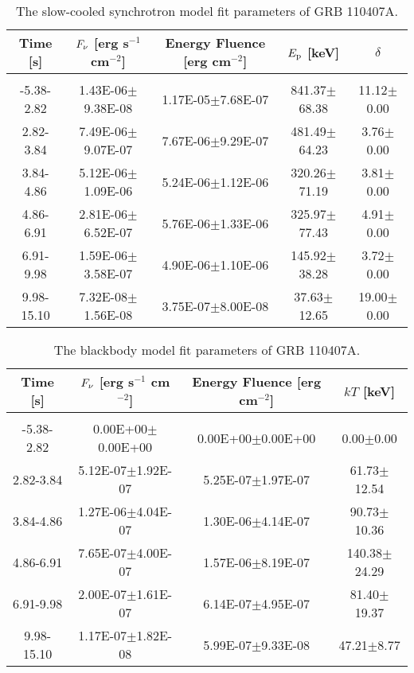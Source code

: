 \begin{table}[h]
\centering
\scriptsize
\label{tab:}
\begin{tabular}{c| c c c c}
Time [s] & $F_{\nu}$ [erg s$^{-1}$ cm$^{-2}$] & Energy Fluence [erg cm$^{-2}$] & $E_{\rm p}$ [keV] & $\delta$ \\
\hline \hline\\ 

-5.38-2.82 & 1.43E-06$\pm$9.38E-08 & 1.17E-05$\pm$7.68E-07 & 841.37$\pm$68.38 & 11.12$\pm$0.00 \\ 

2.82-3.84 & 7.49E-06$\pm$9.07E-07 & 7.67E-06$\pm$9.29E-07 & 481.49$\pm$64.23 & 3.76$\pm$0.00 \\ 

3.84-4.86 & 5.12E-06$\pm$1.09E-06 & 5.24E-06$\pm$1.12E-06 & 320.26$\pm$71.19 & 3.81$\pm$0.00 \\ 

4.86-6.91 & 2.81E-06$\pm$6.52E-07 & 5.76E-06$\pm$1.33E-06 & 325.97$\pm$77.43 & 4.91$\pm$0.00 \\ 

6.91-9.98 & 1.59E-06$\pm$3.58E-07 & 4.90E-06$\pm$1.10E-06 & 145.92$\pm$38.28 & 3.72$\pm$0.00 \\ 

9.98-15.10 & 7.32E-08$\pm$1.56E-08 & 3.75E-07$\pm$8.00E-08 & 37.63$\pm$12.65 & 19.00$\pm$0.00 \\ 

\end{tabular}
\caption{The slow-cooled synchrotron model fit parameters of GRB 110407A.}
\end{table}

\begin{table}[h]
\centering
\scriptsize
\label{tab:}
\begin{tabular}{c| c c c}
Time [s] & $F_{\nu}$ [erg s$^{-1}$ cm$^{-2}$] & Energy Fluence [erg cm$^{-2}$] & $kT$ [keV] \\
\hline \hline\\ 

-5.38-2.82 & 0.00E+00$\pm$0.00E+00 & 0.00E+00$\pm$0.00E+00 & 0.00$\pm$0.00 \\ 

2.82-3.84 & 5.12E-07$\pm$1.92E-07 & 5.25E-07$\pm$1.97E-07 & 61.73$\pm$12.54 \\ 

3.84-4.86 & 1.27E-06$\pm$4.04E-07 & 1.30E-06$\pm$4.14E-07 & 90.73$\pm$10.36 \\ 

4.86-6.91 & 7.65E-07$\pm$4.00E-07 & 1.57E-06$\pm$8.19E-07 & 140.38$\pm$24.29 \\ 

6.91-9.98 & 2.00E-07$\pm$1.61E-07 & 6.14E-07$\pm$4.95E-07 & 81.40$\pm$19.37 \\ 

9.98-15.10 & 1.17E-07$\pm$1.82E-08 & 5.99E-07$\pm$9.33E-08 & 47.21$\pm$8.77 \\ 

\end{tabular}
\caption{The blackbody model fit parameters of GRB 110407A.}
\end{table}


